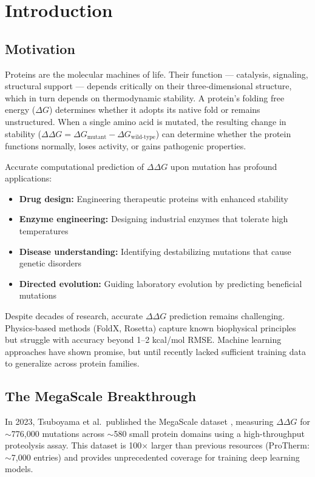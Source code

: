 \chapter{Introduction}
\label{ch:introduction}

\section{Motivation}

Proteins are the molecular machines of life. Their function --- catalysis, signaling, structural support --- depends critically on their three-dimensional structure, which in turn depends on thermodynamic stability. A protein's folding free energy ($\Delta G$) determines whether it adopts its native fold or remains unstructured. When a single amino acid is mutated, the resulting change in stability ($\Delta\Delta G = \Delta G_{\text{mutant}} - \Delta G_{\text{wild-type}}$) can determine whether the protein functions normally, loses activity, or gains pathogenic properties.

Accurate computational prediction of $\Delta\Delta G$ upon mutation has profound applications:
\begin{itemize}
    \item \textbf{Drug design:} Engineering therapeutic proteins with enhanced stability
    \item \textbf{Enzyme engineering:} Designing industrial enzymes that tolerate high temperatures
    \item \textbf{Disease understanding:} Identifying destabilizing mutations that cause genetic disorders
    \item \textbf{Directed evolution:} Guiding laboratory evolution by predicting beneficial mutations
\end{itemize}

Despite decades of research, accurate $\Delta\Delta G$ prediction remains challenging. Physics-based methods (FoldX, Rosetta) capture known biophysical principles but struggle with accuracy beyond 1--2 kcal/mol RMSE. Machine learning approaches have shown promise, but until recently lacked sufficient training data to generalize across protein families.

\section{The MegaScale Breakthrough}

In 2023, Tsuboyama et al.\ published the MegaScale dataset \cite{tsuboyama2023mega}, measuring $\Delta\Delta G$ for $\sim$776,000 mutations across $\sim$580 small protein domains using a high-throughput proteolysis assay. This dataset is 100$\times$ larger than previous resources (ProTherm: $\sim$7,000 entries) and provides unprecedented coverage for training deep learning models.

